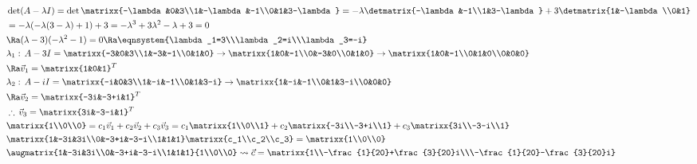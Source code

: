 \begin{align*}
    &\det(A-\lambda I)=\det\matrixx{-\lambda&0&3\\1&-\lambda&-1\\0&1&3-\lambda}=-\lambda\detmatrix{-\lambda&-1\\1&3-\lambda}+3\detmatrix{1&-\lambda\\0&1}\\
    &=-\lambda(-\lambda(3-\lambda)+1)+3=-\lambda^3+3\lambda^2-\lambda+3=0\\
    &\Ra (\lambda-3)(-\lambda^2-1)=0\Ra \eqnsystem{\lambda_1=3\\\lambda_2=i\\\lambda_3=-i}\\
    &\lambda_1:\,A-3I=\matrixx{-3&0&3\\1&-3&-1\\0&1&0}\to\matrixx{1&0&-1\\0&-3&0\\0&1&0}\to\matrixx{1&0&-1\\0&1&0\\0&0&0}\\
    &\Ra \vec{v}_1=\matrixx{1&0&1}^T\\
    &\lambda_2:\,A-iI=\matrixx{-i&0&3\\1&-i&-1\\0&1&3-i}\to\matrixx{1&-i&-1\\0&1&3-i\\0&0&0}\\
    &\Ra \vec{v}_2=\matrixx{-3i&-3+i&1}^T\\
    &\therefore\,\vec{v}_3=\matrixx{3i&-3-i&1}^T\\
    &\matrixx{1\\0\\0}=c_1\vec{v}_1+c_2\vec{v}_2+c_3\vec{v}_3=c_1\matrixx{1\\0\\1}+c_2\matrixx{-3i\\-3+i\\1}+c_3\matrixx{3i\\-3-i\\1}\\
    &\matrixx{1&-3i&3i\\0&-3+i&-3-i\\1&1&1}\matrixx{c_1\\c_2\\c_3}=\matrixx{1\\0\\0}\\
    &\augmatrix{1&-3i&3i\\0&-3+i&-3-i\\1&1&1}{1\\0\\0}\leadsto\vec{c}=\matrixx{1\\-\frac{1}{20}+\frac{3}{20}i\\\-\frac{1}{20}-\frac{3}{20}i}\\

\end{align*}
